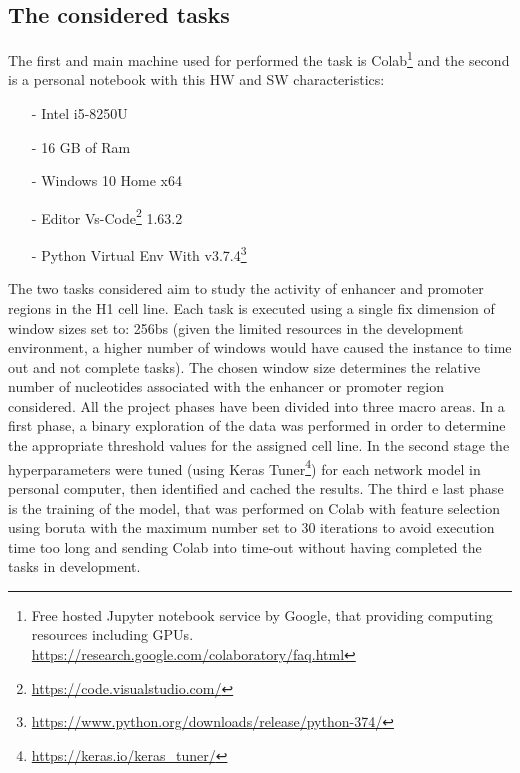 \documentclass{article}
\begin{document}
\newpage
\subsection{The considered tasks}
\label{sec:Task}
The first and main machine used for performed the task is Colab\footnote{Free hosted Jupyter notebook service by Google, that providing computing resources including GPUs. \url{https://research.google.com/colaboratory/faq.html}} and the second is a personal notebook with this HW and SW characteristics:
\begin{itemize}
    \item[-] Intel i5-8250U
    \item[-] 16 GB of Ram
    \item[-] Windows 10 Home x64
    \item[-] Editor Vs-Code\footnote{\url{https://code.visualstudio.com/}} 1.63.2 
    \item[-] Python Virtual Env With v3.7.4\footnote{\url{https://www.python.org/downloads/release/python-374/}}
\end{itemize}
The two tasks considered aim to study the activity of enhancer and promoter regions in the H1 cell line. Each task is executed using a single fix dimension of window sizes set to: 256\acrshort{bs} (given the limited resources in the development environment, a higher number of windows would have caused the instance to time out and not complete tasks). The chosen window size determines the relative number of nucleotides associated with the enhancer or promoter region considered. All the project phases have been divided into three macro areas. In a first phase, a binary exploration of the data was performed in order to determine the appropriate threshold values for the assigned cell line. In the second stage the hyperparameters were tuned (using Keras Tuner\footnote{\url{https://keras.io/keras_tuner/}}) for each network model in personal computer, then identified and cached the results. The third e last phase is the training of the model, that was performed on Colab with feature selection using boruta with the maximum number set to 30 iterations to avoid execution time too long and sending Colab into time-out without having completed the tasks in development.
\end{document}
